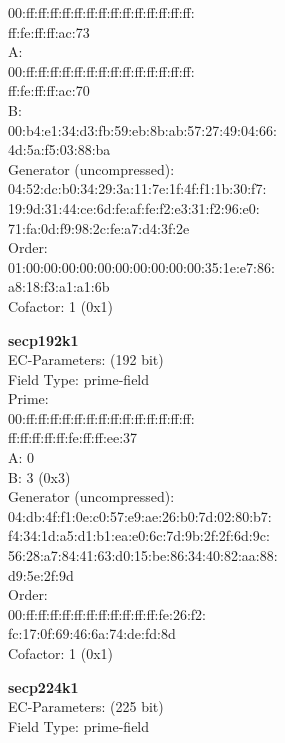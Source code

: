     00:ff:ff:ff:ff:ff:ff:ff:ff:ff:ff:ff:ff:ff:ff:\\
    ff:fe:ff:ff:ac:73\\
A:   \\
    00:ff:ff:ff:ff:ff:ff:ff:ff:ff:ff:ff:ff:ff:ff:\\
    ff:fe:ff:ff:ac:70\\
B:   \\
    00:b4:e1:34:d3:fb:59:eb:8b:ab:57:27:49:04:66:\\
    4d:5a:f5:03:88:ba\\
Generator (uncompressed):\\
    04:52:dc:b0:34:29:3a:11:7e:1f:4f:f1:1b:30:f7:\\
    19:9d:31:44:ce:6d:fe:af:fe:f2:e3:31:f2:96:e0:\\
    71:fa:0d:f9:98:2c:fe:a7:d4:3f:2e\\
Order: \\
    01:00:00:00:00:00:00:00:00:00:00:35:1e:e7:86:\\
    a8:18:f3:a1:a1:6b\\
Cofactor:  1 (0x1)\\
\item \textbf{ secp192k1 }\\
EC-Parameters: (192 bit)\\
Field Type: prime-field\\
Prime:\\
    00:ff:ff:ff:ff:ff:ff:ff:ff:ff:ff:ff:ff:ff:ff:\\
    ff:ff:ff:ff:ff:fe:ff:ff:ee:37\\
A:    0\\
B:    3 (0x3)\\
Generator (uncompressed):\\
    04:db:4f:f1:0e:c0:57:e9:ae:26:b0:7d:02:80:b7:\\
    f4:34:1d:a5:d1:b1:ea:e0:6c:7d:9b:2f:2f:6d:9c:\\
    56:28:a7:84:41:63:d0:15:be:86:34:40:82:aa:88:\\
    d9:5e:2f:9d\\
Order: \\
    00:ff:ff:ff:ff:ff:ff:ff:ff:ff:ff:ff:fe:26:f2:\\
    fc:17:0f:69:46:6a:74:de:fd:8d\\
Cofactor:  1 (0x1)\\
\item \textbf{ secp224k1 }\\
EC-Parameters: (225 bit)\\
Field Type: prime-field\\

